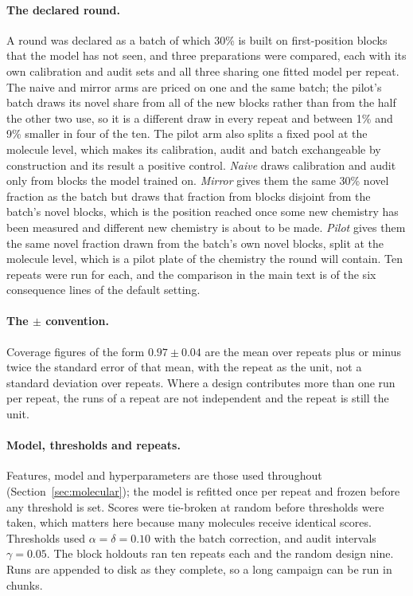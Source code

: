 \documentclass[10pt]{article}
\begin{document}
\paragraph{The declared round.} A round was declared as a batch of which 30\% is built on first-position blocks that the model has not seen, and three preparations were compared, each with its own calibration and audit sets and all three sharing one fitted model per repeat. The naive and mirror arms are priced on one and the same batch; the pilot's batch draws its novel share from all of the new blocks rather than from the half the other two use, so it is a different draw in every repeat and between 1\% and 9\% smaller in four of the ten. The pilot arm also splits a fixed pool at the molecule level, which makes its calibration, audit and batch exchangeable by construction and its result a positive control. \emph{Naive} draws calibration and audit only from blocks the model trained on. \emph{Mirror} gives them the same 30\% novel fraction as the batch but draws that fraction from blocks disjoint from the batch's novel blocks, which is the position reached once some new chemistry has been measured and different new chemistry is about to be made. \emph{Pilot} gives them the same novel fraction drawn from the batch's own novel blocks, split at the molecule level, which is a pilot plate of the chemistry the round will contain. Ten repeats were run for each, and the comparison in the main text is of the six consequence lines of the default setting.

\paragraph{The $\pm$ convention.} Coverage figures of the form $0.97\pm0.04$ are the mean over repeats plus or minus twice the standard error of that mean, with the repeat as the unit, not a standard deviation over repeats. Where a design contributes more than one run per repeat, the runs of a repeat are not independent and the repeat is still the unit.

\paragraph{Model, thresholds and repeats.} Features, model and hyperparameters are those used throughout (Section~\ref{sec:molecular}); the model is refitted once per repeat and frozen before any threshold is set. Scores were tie-broken at random before thresholds were taken, which matters here because many molecules receive identical scores. Thresholds used $\alpha=\delta=0.10$ with the batch correction, and audit intervals $\gamma=0.05$. The block holdouts ran ten repeats each and the random design nine. Runs are appended to disk as they complete, so a long campaign can be run in chunks.
\end{document}
